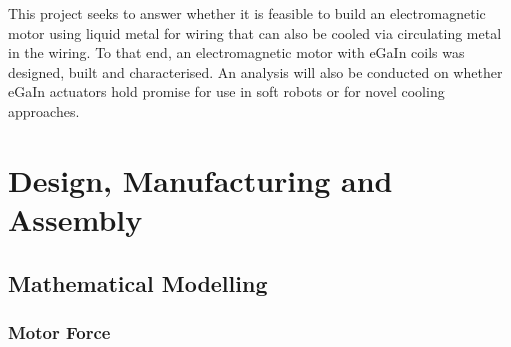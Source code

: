 \documentclass[a4paper,12pt]{article}
\begin{document}
This project seeks to answer whether it is feasible to build an electromagnetic motor using liquid metal for wiring that can also be cooled via circulating metal in the wiring. To that end, an electromagnetic motor with eGaIn coils was designed, built and characterised. An analysis will also be conducted on whether eGaIn actuators hold promise for use in soft robots or for novel cooling approaches. 

\newpage

\section{Design, Manufacturing and Assembly}
\subsection{Mathematical Modelling}
\subsubsection{Motor Force}
\end{document}
